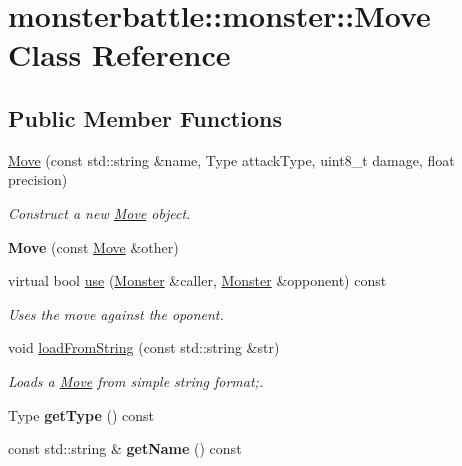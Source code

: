 \hypertarget{classmonsterbattle_1_1monster_1_1Move}{}\section{monsterbattle\+:\+:monster\+:\+:Move Class Reference}
\label{classmonsterbattle_1_1monster_1_1Move}
\subsection*{Public Member Functions}
\begin{DoxyCompactItemize}
\item 
\hyperlink{classmonsterbattle_1_1monster_1_1Move_a2d0993847943d7531711662db9edc7f7}{Move} (const std\+::string \&name, Type attack\+Type, uint8\+\_\+t damage, float precision)
\begin{DoxyCompactList}\small\item\em Construct a new \hyperlink{classmonsterbattle_1_1monster_1_1Move}{Move} object. \end{DoxyCompactList}\item 
\mbox{\label{classmonsterbattle_1_1monster_1_1Move_ab7fc7c3872257d13180e07d27d317487}} 
{\bfseries Move} (const \hyperlink{classmonsterbattle_1_1monster_1_1Move}{Move} \&other)
\item 
virtual bool \hyperlink{classmonsterbattle_1_1monster_1_1Move_ad79bfc6b6a00140b47efd01924b44df0}{use} (\hyperlink{classmonsterbattle_1_1monster_1_1Monster}{Monster} \&caller, \hyperlink{classmonsterbattle_1_1monster_1_1Monster}{Monster} \&opponent) const
\begin{DoxyCompactList}\small\item\em Uses the move against the \textquotesingle{}oponent\textquotesingle{}. \end{DoxyCompactList}\item 
void \hyperlink{classmonsterbattle_1_1monster_1_1Move_a60c469648f7e04e7bf3081d9e165003c}{load\+From\+String} (const std\+::string \&str)
\begin{DoxyCompactList}\small\item\em Loads a \hyperlink{classmonsterbattle_1_1monster_1_1Move}{Move} from simple string format;. \end{DoxyCompactList}\item 
\mbox{\label{classmonsterbattle_1_1monster_1_1Move_ae6ab4429617bc2fee4a106c1de2442bf}} 
Type {\bfseries get\+Type} () const
\item 
\mbox{\label{classmonsterbattle_1_1monster_1_1Move_ac30ae1e2dfb70ae49374e3f8c08e61d6}} 
const std\+::string \& {\bfseries get\+Name} () const
\end{DoxyCompactItemize}
